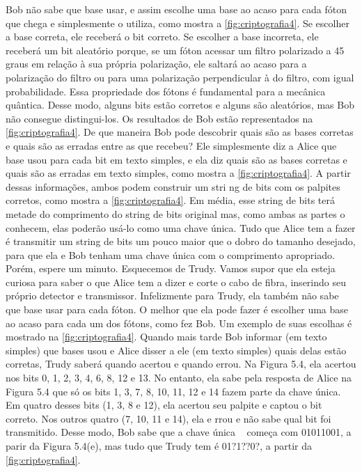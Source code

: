 Bob não sabe que base usar, e assim escolhe uma base ao acaso para cada fóton que chega e
simplesmente o utiliza, como mostra a \ref{fig:criptografia4}. Se escolher a base correta, ele receberá o bit correto. Se escolher a base incorreta, ele receberá um bit aleatório porque, se um fóton acessar um filtro polarizado a 45 graus em relação à sua própria polarização, ele saltará ao acaso para a polarização do filtro ou para uma polarização perpendicular à do filtro, com igual probabilidade.
Essa propriedade dos fótons é fundamental para a mecânica quântica. Desse modo, alguns bits estão corretos e alguns são aleatórios, mas Bob não consegue distingui-los. Os resultados de Bob  estão representados na \ref{fig:criptografia4}.
De que maneira Bob pode descobrir quais são as bases corretas e quais são as erradas entre as
que recebeu? Ele simplesmente diz a Alice que base usou para cada bit em texto simples, e ela diz quais são as bases corretas e quais são as erradas em texto simples, como mostra a \ref{fig:criptografia4}. A partir dessas informações, ambos podem construir um stri ng de bits com os palpites
corretos, como mostra a \ref{fig:criptografia4}. Em média, esse string de bits terá metade do comprimento do string de bits original mas, como ambas as partes o conhecem, elas poderão usá-lo como uma chave única. Tudo que Alice tem a fazer é transmitir um string de bits um pouco maior que o dobro do tamanho desejado, para que ela e Bob tenham uma chave única com o comprimento apropriado.
Porém, espere um minuto. Esquecemos de Trudy. Vamos supor que ela esteja curiosa para saber o
que Alice tem a dizer e corte o cabo de fibra, inserindo seu próprio detector e transmissor.
Infelizmente para Trudy, ela também não sabe que base usar para cada fóton. O melhor que ela
pode fazer é escolher uma base ao acaso para cada um dos fótons, como fez Bob. Um exemplo de
suas escolhas é mostrado na \ref{fig:criptografia4}. Quando mais tarde Bob informar (em texto simples) que
bases usou e Alice disser a ele (em texto simples) quais delas estão corretas, Trudy saberá quando acertou e quando errou. Na Figura 5.4, ela acertou nos bits 0, 1, 2, 3, 4, 6, 8, 12 e 13. No entanto, ela sabe pela resposta de Alice na Figura 5.4 que só os bits 1, 3, 7, 8, 10, 11, 12 e 14 fazem parte da chave única. Em quatro desses bits (1, 3, 8 e 12), ela acertou seu palpite e captou o bit correto. Nos outros quatro (7, 10, 11 e 14), ela e rrou e não sabe qual bit foi transmitido. Desse modo, Bob sabe que a chave única ~\cite{tanenbaum} começa com 01011001, a parir da Figura 5.4(e), mas tudo que Trudy tem é 01?1??0?, a partir da \ref{fig:criptografia4}.

